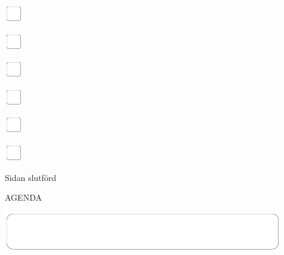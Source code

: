 \documentclass[11pt,titlepage]{article}
\begin{document}
\vspace{10mm}

\noindent
\includegraphics[]{checkbox-4mm.pdf}

\vspace{10mm}

\noindent
\includegraphics[]{checkbox-4mm.pdf}

\vspace{10mm}

\noindent
\includegraphics[]{checkbox-4mm.pdf}

\vspace{10mm}

\noindent
\includegraphics[]{checkbox-4mm.pdf}

\vspace{10mm}

\noindent
\includegraphics[]{checkbox-4mm.pdf}

\vspace{10mm}

\noindent
\includegraphics[]{checkbox-4mm.pdf}

\vspace{4mm}

\hfill Sidan slutförd \hspace{20mm}

\pagebreak

\small %
\hfill AGENDA

\vspace{6mm}

\noindent
\includegraphics[]{mediumbox.pdf}
\end{document}
